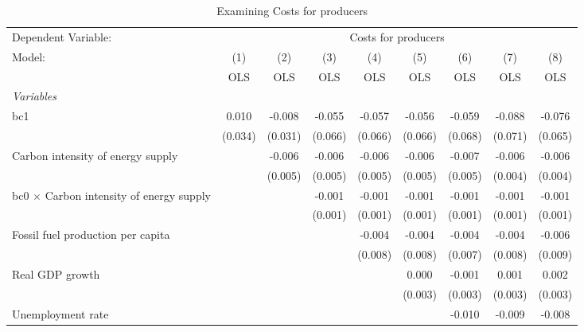 
\begin{table}[htbp]
   \caption{Examining Costs for producers}
   \centering
   \begin{tabular}{lcccccccc}
      \toprule
      Dependent Variable: & \multicolumn{8}{c}{Costs for producers}\\
      Model:                                          & (1)     & (2)     & (3)     & (4)     & (5)     & (6)     & (7)     & (8)\\  
                                                      &  OLS    & OLS     & OLS     & OLS     & OLS     & OLS     & OLS     & OLS\\  
      \midrule
      \emph{Variables}\\
      bc1                                             & 0.010   & -0.008  & -0.055  & -0.057  & -0.056  & -0.059  & -0.088  & -0.076\\   
                                                      & (0.034) & (0.031) & (0.066) & (0.066) & (0.066) & (0.068) & (0.071) & (0.065)\\   
      Carbon intensity of energy supply               &         & -0.006  & -0.006  & -0.006  & -0.006  & -0.007  & -0.006  & -0.006\\   
                                                      &         & (0.005) & (0.005) & (0.005) & (0.005) & (0.005) & (0.004) & (0.004)\\   
      bc0 $\times$ Carbon intensity of energy supply  &         &         & -0.001  & -0.001  & -0.001  & -0.001  & -0.001  & -0.001\\   
                                                      &         &         & (0.001) & (0.001) & (0.001) & (0.001) & (0.001) & (0.001)\\   
      Fossil fuel production per capita               &         &         &         & -0.004  & -0.004  & -0.004  & -0.004  & -0.006\\   
                                                      &         &         &         & (0.008) & (0.008) & (0.007) & (0.008) & (0.009)\\   
      Real GDP growth                                 &         &         &         &         & 0.000   & -0.001  & 0.001   & 0.002\\   
                                                      &         &         &         &         & (0.003) & (0.003) & (0.003) & (0.003)\\   
      Unemployment rate                               &         &         &         &         &         & -0.010  & -0.009  & -0.008\\   

\end{tabular}
\end{table}
